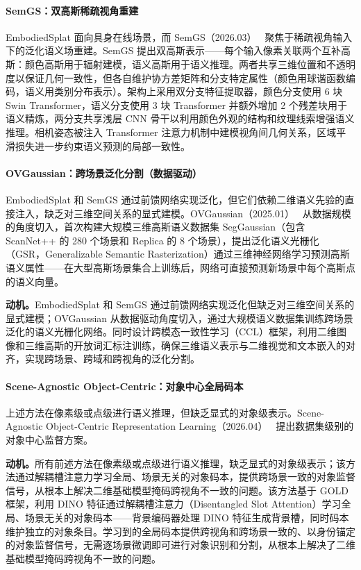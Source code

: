 \paragraph{SemGS：双高斯稀疏视角重建} EmbodiedSplat 面向具身在线场景，而 SemGS（2026.03）~\cite{2603_02548} 聚焦于稀疏视角输入下的泛化语义场重建。SemGS 提出双高斯表示——每个输入像素关联两个互补高斯：颜色高斯用于辐射建模，语义高斯用于语义推理。两者共享三维位置和不透明度以保证几何一致性，但各自维护协方差矩阵和分支特定属性（颜色用球谐函数编码，语义用类别分布表示）。架构上采用双分支特征提取器，颜色分支使用 6 块 Swin Transformer，语义分支使用 3 块 Transformer 并额外增加 2 个残差块用于语义精炼，两分支共享浅层 CNN 骨干以利用颜色外观的结构和纹理线索增强语义推理。相机姿态被注入 Transformer 注意力机制中建模视角间几何关系，区域平滑损失进一步约束语义预测的局部一致性。

\paragraph{OVGaussian：跨场景泛化分割（数据驱动）} EmbodiedSplat 和 SemGS 通过前馈网络实现泛化，但它们依赖二维语义先验的直接注入，缺乏对三维空间关系的显式建模。OVGaussian（2025.01）~\cite{2501_00326} 从数据规模的角度切入，首次构建大规模三维高斯语义数据集 SegGaussian（包含 ScanNet++ 的 280 个场景和 Replica 的 8 个场景），提出泛化语义光栅化（GSR，Generalizable Semantic Rasterization）通过三维神经网络学习预测高斯语义属性——在大型高斯场景集合上训练后，网络可直接预测新场景中每个高斯点的语义向量。

\textbf{动机。}EmbodiedSplat 和 SemGS 通过前馈网络实现泛化但缺乏对三维空间关系的显式建模；OVGaussian 从数据驱动角度切入，通过大规模语义数据集训练跨场景泛化的语义光栅化网络。同时设计跨模态一致性学习（CCL）框架，利用二维图像和三维高斯的开放词汇标注训练，确保三维语义表示与二维视觉和文本嵌入的对齐，实现跨场景、跨域和跨视角的泛化分割。

\paragraph{Scene-Agnostic Object-Centric：对象中心全局码本} 上述方法在像素级或点级进行语义推理，但缺乏显式的对象级表示。Scene-Agnostic Object-Centric Representation Learning（2026.04）~\cite{2604_09045} 提出数据集级别的对象中心监督方案。

\textbf{动机。}所有前述方法在像素级或点级进行语义推理，缺乏显式的对象级表示；该方法通过解耦槽注意力学习全局、场景无关的对象码本，提供跨场景一致的对象监督信号，从根本上解决二维基础模型掩码跨视角不一致的问题。该方法基于 GOLD 框架，利用 DINO 特征通过解耦槽注意力（Disentangled Slot Attention）学习全局、场景无关的对象码本——背景编码器处理 DINO 特征生成背景槽，同时码本维护独立的对象条目。学习到的全局码本提供跨视角和跨场景一致的、以身份锚定的对象监督信号，无需逐场景微调即可进行对象识别和分割，从根本上解决了二维基础模型掩码跨视角不一致的问题。

